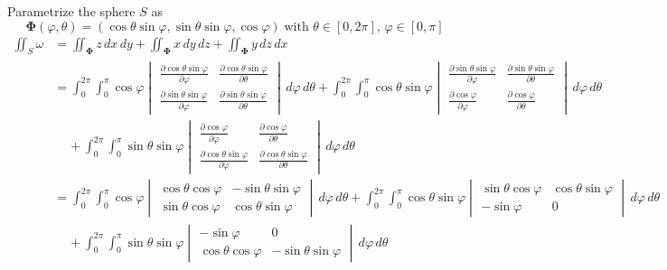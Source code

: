 \documentclass{article}
\newcommand{\partis}[2]{\frac{\partial #2}{\partial #1}}
\begin{document}
\begin{enumerate}
    Parametrize the sphere $S$ as 
    \[ \boldsymbol \Phi (\varphi, \theta) = ( \cos\theta \sin\varphi , \sin\theta \sin\varphi, \cos\varphi)\; \text{with }\theta \in [0,2\pi],\, \varphi \in [0,\pi] \]
    \begin{align*}
        \iint_S \omega &= \iint_{\boldsymbol \Phi} z \, dx \, dy + \iint_{\boldsymbol \Phi} x \, dy \, dz + \iint_{\boldsymbol \Phi} y \, dz \, dx \\
        &= \int_0^{2\pi} \int_0^{\pi} \cos \varphi \begin{vmatrix}\partis{\varphi}{\cos\theta \sin \varphi} & \partis{\theta}{\cos\theta \sin \varphi} \\ \partis{\varphi}{\sin\theta \sin\varphi} & \partis{\theta}{\sin\theta \sin\varphi} \end{vmatrix} \, d\varphi \, d\theta + \int_0^{2\pi} \int_0^{\pi} \cos\theta \sin\varphi \begin{vmatrix} \partis{\varphi}{\sin\theta \sin\varphi} & \partis{\theta}{\sin\theta \sin\varphi} \\ \partis{\varphi}{\cos \varphi} & \partis{\theta}{\cos \varphi} \end{vmatrix}\, d\varphi \, d\theta \\
        & \; \; \; \; + \int_0^{2\pi} \int_0^{\pi} \sin\theta \sin\varphi \begin{vmatrix} \partis{\varphi}{\cos \varphi} & \partis{\theta}{\cos \varphi} \\ \partis{\varphi}{\cos\theta \sin\varphi} & \partis{\theta}{\cos\theta \sin\varphi}\end{vmatrix}\, d\varphi \, d\theta \\
        &= \int_0^{2\pi} \int_0^{\pi} \cos \varphi \begin{vmatrix}\cos \theta \cos \varphi & - \sin \theta \sin \varphi  \\ \sin \theta \cos \varphi & \cos \theta \sin \varphi \end{vmatrix} \, d\varphi \, d\theta + \int_0^{2\pi} \int_0^{\pi} \cos\theta \sin\varphi \begin{vmatrix} \sin \theta \cos \varphi & \cos \theta \sin \varphi \\ -\sin \varphi & 0 \end{vmatrix}\, d\varphi \, d\theta \\
        & \; \; \; \; + \int_0^{2\pi} \int_0^{\pi} \sin\theta \sin\varphi \begin{vmatrix} -\sin \varphi & 0 \\ \cos \theta \cos \varphi & - \sin \theta \sin \varphi \end{vmatrix}\, d\varphi \, d\theta \\

\end{align*}
\end{enumerate}
\end{document}
